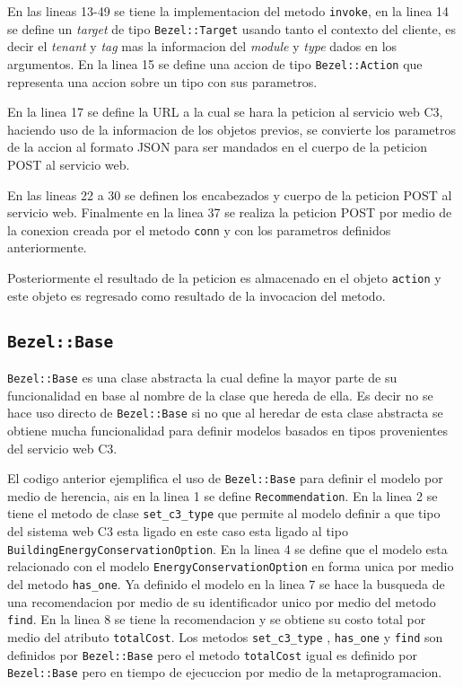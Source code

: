 En las lineas 13-49 se tiene la implementacion del metodo \texttt{invoke}, en 
la linea 14 se define un \textit{target} de tipo \texttt{Bezel::Target} usando 
tanto el contexto del cliente, es decir el \textit{tenant} y \textit{tag} mas 
la informacion del \textit{module} y \textit{type} dados en los argumentos.
En la linea 15 se define una accion de tipo \texttt{Bezel::Action} que representa
una accion sobre un tipo con sus parametros.

En la linea 17 se define la URL a la cual se hara la peticion al servicio web C3,
haciendo uso de la informacion de los objetos previos, se convierte los parametros
de la accion al formato JSON para ser mandados en el cuerpo de la peticion POST
al servicio web.


En las lineas 22 a 30 se definen los encabezados y cuerpo de la peticion POST al
servicio web. Finalmente en la linea 37 se realiza la peticion POST por medio
de la conexion creada por el metodo \texttt{conn} y con los parametros definidos
anteriormente.

Posteriormente el resultado de la peticion es almacenado en el objeto \texttt{action}
y este objeto es regresado como resultado de la invocacion del metodo.

\subsection{\texttt{Bezel::Base}}

\texttt{Bezel::Base} es una clase abstracta la cual define la mayor parte de su
funcionalidad en base al nombre de la clase que hereda de ella. Es decir no se hace
uso directo de \texttt{Bezel::Base} si no que al heredar de esta clase abstracta
se obtiene mucha funcionalidad para definir modelos basados en tipos provenientes
del servicio web C3.



El codigo anterior ejemplifica el uso de \texttt{Bezel::Base} para definir el modelo
por medio de herencia, ais en la linea 1 se define \texttt{Recommendation}. En la linea 2
se tiene el metodo de clase \texttt{set\_c3\_type} que permite al modelo definir a que
tipo del sistema web C3 esta ligado en este caso esta ligado al tipo
\texttt{BuildingEnergyConservationOption}. En la linea 4 se define que el modelo
esta relacionado con el modelo \texttt{EnergyConservationOption} en forma unica por
medio del metodo \texttt{has\_one}. Ya definido el modelo en la linea 7 se 
hace la busqueda de una recomendacion por medio de su identificador unico por medio
del metodo \texttt{find}. En la linea 8 se tiene la recomendacion y se obtiene
su costo total por medio del atributo \texttt{totalCost}. Los metodos \texttt{set\_c3\_type}
, \texttt{has\_one} y \texttt{find} son definidos por \texttt{Bezel::Base} pero
el metodo \texttt{totalCost} igual es definido por \texttt{Bezel::Base} pero en
tiempo de ejecuccion por medio de la metaprogramacion.

